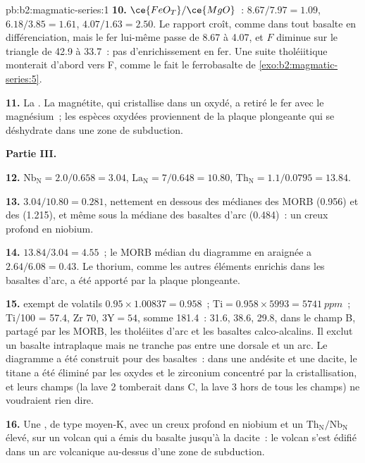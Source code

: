 \begin{solution}{pb:b2:magmatic-series:1}
\textbf{10.} $\ce{FeO_T}/\ce{MgO}$~: $8.67/7.97 = 1.09$, $6.18/3.85 = 1.61$, $4.07/1.63 =
2.50$. Le rapport croît, comme dans tout basalte en différenciation, mais le fer lui-même
passe de 8.67 à 4.07, et $F$ diminue sur le triangle de 42.9 à 33.7~: pas d'enrichissement en fer. Une suite
tholéiitique monterait d'abord vers F, comme le fait le ferrobasalte de
\cref{exo:b2:magmatic-series:5}.

\textbf{11.} La . La magnétite, qui cristallise dans un  oxydé,
a retiré le fer avec le magnésium~; les espèces oxydées proviennent de la plaque plongeante
qui se déshydrate dans une zone de subduction.

\noindent\textbf{Partie III.}

\textbf{12.} $\mathrm{Nb_N} = 2.0/0.658 = 3.04$, $\mathrm{La_N} = 7/0.648 = 10.80$,
$\mathrm{Th_N} = 1.1/0.0795 = 13.84$.

\textbf{13.} $3.04/10.80 = 0.281$, nettement en dessous des médianes des MORB (0.956) et des
 (1.215), et même sous la médiane des basaltes d'arc (0.484)~: un creux
profond en niobium.

\textbf{14.} $13.84/3.04 = 4.55$~; le MORB médian du diagramme en araignée a $2.64/6.08 =
0.43$. Le thorium, comme les autres éléments enrichis dans les basaltes d'arc, a été apporté par la
plaque plongeante.

\textbf{15.}  exempt de volatils $0.95\times1.00837 = 0.958$~; $\mathrm{Ti} =
0.958\times5993 = \qty{5741}{ppm}$~; Ti/100 = 57.4, Zr 70, $3\mathrm Y = 54$, somme 181.4~:
31.6, 38.6, 29.8, dans le champ B, partagé par les MORB, les tholéiites d'arc et les basaltes calco-alcalins.
Il exclut un basalte intraplaque mais ne tranche pas entre une dorsale et un arc. Le
diagramme a été construit pour des basaltes~: dans une andésite et une dacite, le titane a été éliminé
par les oxydes et le zirconium concentré par la cristallisation, et leurs champs (la lave 2
tomberait dans C, la lave 3 hors de tous les champs) ne voudraient rien dire.

\textbf{16.} Une , de type moyen-K, avec un creux profond en niobium et un
$\mathrm{Th_N}/\mathrm{Nb_N}$ élevé, sur un volcan qui a émis du basalte jusqu'à la dacite~: le volcan
s'est édifié dans un arc volcanique au-dessus d'une zone de subduction.


\end{solution}
